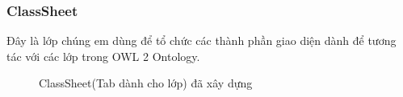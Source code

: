 \subsubsection{ClassSheet}
Đây là lớp chúng em dùng để tổ chức các thành phần giao diện dành để tương tác với các lớp trong OWL 2 Ontology.
\begin{figure}[h!]
	\centering
	\caption{ClassSheet(Tab dành cho lớp) đã xây dựng\label{overflow}}
\end{figure}
{\let\thefootnote\relax{}}
